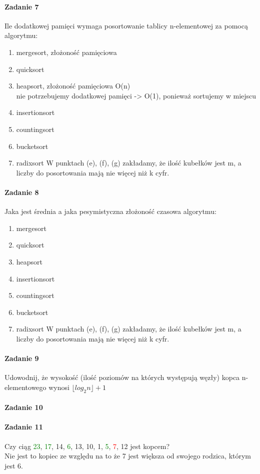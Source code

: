 \documentclass[18pt]{extarticle}
\begin{document}
\paragraph{Zadanie 7} Ile dodatkowej pamięci wymaga posortowanie tablicy n-elementowej za pomocą algorytmu: \\
\begin{enumerate}[label=\alph*.]
    \item mergesort, złożoność pamięciowa 
    \item quicksort
    \item heapsort, złożoność pamięciowa O(n)\\
            nie potrzebujemy dodatkowej pamięci -> O(1), ponieważ sortujemy w miejscu
    \item insertionsort
    \item countingsort
    \item bucketsort
    \item radixsort
    W punktach (e), (f), (g) zakładamy, że ilość kubełków jest m, a liczby do posortowania mają nie więcej niż k cyfr.
\end{enumerate}

\paragraph{Zadanie 8} Jaka jest średnia a jaka pesymistyczna złożoność czasowa algorytmu: \\
\begin{enumerate}[label=\alph*]
    \item mergesort
    \item quicksort
    \item heapsort
    \item insertionsort
    \item countingsort
    \item bucketsort
    \item radixsort
    W punktach (e), (f), (g) zakładamy, że ilość kubełków jest m, a liczby do posortowania mają nie więcej niż k cyfr.
\end{enumerate}

\paragraph{Zadanie 9} Udowodnij, że wysokość (ilość poziomów na których występują węzły) kopca n-elementowego wynosi $\lfloor log_2 n \rfloor + 1$ \\


\paragraph{Zadanie 10}


\paragraph{Zadanie 11} Czy ciąg {\textcolor{green}{23}, \textcolor{green}{17}, 14, \textcolor{green}{6}, 13, 10, 1, \textcolor{green}{5}, \textcolor{red}{7}, 12} jest kopcem? \\

Nie jest to kopiec ze względu na to że 7 jest większa od swojego rodzica, którym jest 6. \\ 
\end{document}
